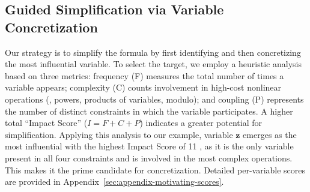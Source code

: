 

\subsection{Guided Simplification via Variable Concretization}

Our strategy is to simplify the formula by first identifying and then concretizing the most influential variable. To select the target, we employ a heuristic analysis based on three metrics: frequency (F) measures the total number of times a variable appears; complexity (C) counts involvement in high-cost nonlinear operations (\eg, powers, products of variables, modulo); and coupling (P) represents the number of distinct constraints in which the variable participates. A higher total ``Impact Score'' ($I = F+C+P$) indicates a greater potential for simplification. Applying this analysis to our example, variable $\mathbf{z}$ emerges as the most influential with the highest Impact Score of 11 , as it is the only variable present in all four constraints and is involved in the most complex operations. This makes it the prime candidate for concretization. Detailed per-variable scores are provided in Appendix~\ref{sec:appendix-motivating-scores}.

